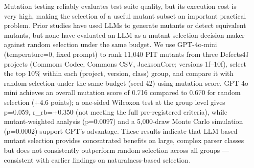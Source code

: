 Mutation testing reliably evaluates test suite quality, but its execution cost is very high, making the selection of a useful mutant subset an important practical problem. Prior studies have used LLMs to generate mutants or detect equivalent mutants, but none have evaluated an LLM as a mutant-selection decision maker against random selection under the same budget. We use GPT-4o-mini (temperature=0, fixed prompt) to rank 11,040 PIT mutants from three Defects4J projects (Commons Codec, Commons CSV, JacksonCore; versions 1f–10f), select the top 10\% within each (project, version, class) group, and compare it with random selection under the same budget (seed 42) using mutation score. GPT-4o-mini achieves an overall mutation score of 0.716 compared to 0.670 for random selection (+4.6 points); a one-sided Wilcoxon test at the group level gives p=0.059, r\_rb=+0.350 (not meeting the full pre-registered criteria), while mutant-weighted analysis (p=0.0097) and a 5,000-draw Monte Carlo simulation (p=0.0002) support GPT's advantage. These results indicate that LLM-based mutant selection provides concentrated benefits on large, complex parser classes but does not consistently outperform random selection across all groups — consistent with earlier findings on naturalness-based selection.
